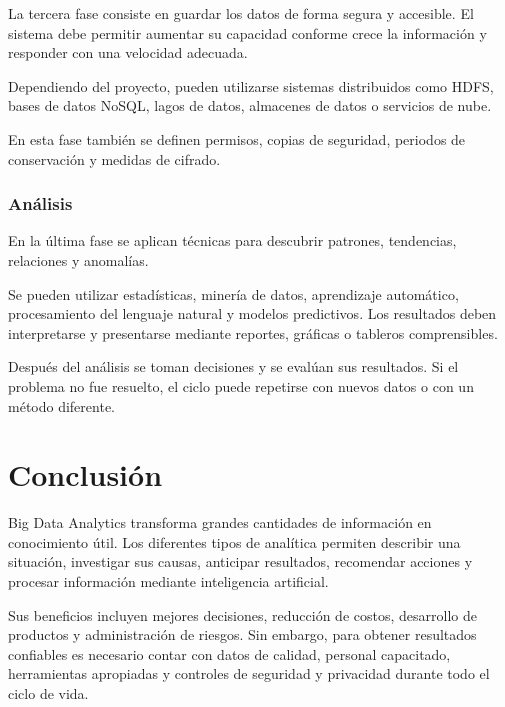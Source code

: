 La tercera fase consiste en guardar los datos de forma segura y accesible. El
sistema debe permitir aumentar su capacidad conforme crece la información y
responder con una velocidad adecuada.

Dependiendo del proyecto, pueden utilizarse sistemas distribuidos como HDFS,
bases de datos NoSQL, lagos de datos, almacenes de datos o servicios de nube.

En esta fase también se definen permisos, copias de seguridad, periodos de
conservación y medidas de cifrado.

\subsubsection*{Análisis}

En la última fase se aplican técnicas para descubrir patrones, tendencias,
relaciones y anomalías.

Se pueden utilizar estadísticas, minería de datos, aprendizaje automático,
procesamiento del lenguaje natural y modelos predictivos. Los resultados
deben interpretarse y presentarse mediante reportes, gráficas o tableros
comprensibles.

Después del análisis se toman decisiones y se evalúan sus resultados. Si el
problema no fue resuelto, el ciclo puede repetirse con nuevos datos o con un
método diferente.

\section{Conclusión}

Big Data Analytics transforma grandes cantidades de información en
conocimiento útil. Los diferentes tipos de analítica permiten describir una
situación, investigar sus causas, anticipar resultados, recomendar acciones y
procesar información mediante inteligencia artificial.

Sus beneficios incluyen mejores decisiones, reducción de costos, desarrollo
de productos y administración de riesgos. Sin embargo, para obtener resultados
confiables es necesario contar con datos de calidad, personal capacitado,
herramientas apropiadas y controles de seguridad y privacidad durante todo el
ciclo de vida.
